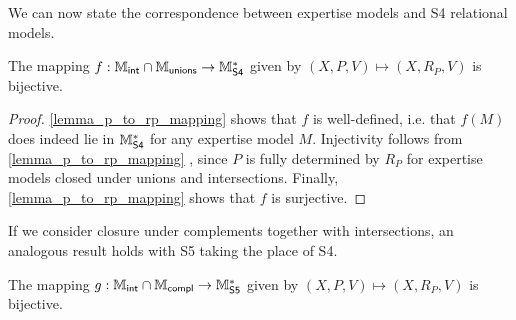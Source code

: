 We can now state the correspondence between expertise models and S4 relational
models.

\begin{theorem}
\label{thm_s4_semantic_link}

    The mapping $f: \mathbb{M}_{\mathsf{int}} \cap \mathbb{M}_{\mathsf{unions}} \to \mathbb{M}^*_{\mathsf{S4}}$ given by $(X, P, V)
    \mapsto (X, R_P, V)$ is bijective.
\end{theorem}

\begin{proof}

    \cref{lemma_p_to_rp_mapping}  shows that $f$ is
    well-defined, i.e. that $f(M)$ does indeed lie in $\mathbb{M}^*_{\mathsf{S4}}$ for any
    expertise model $M$. Injectivity follows from \cref{lemma_p_to_rp_mapping}
    , since $P$ is fully determined by $R_P$ for
    expertise models closed under unions and intersections. Finally,
    \cref{lemma_p_to_rp_mapping}  shows that $f$
    is surjective.

\end{proof}

If we consider closure under complements together with intersections, an
analogous result holds with S5 taking the place of S4.

\begin{theorem}
\label{thm_s5_semantic_link}

    The mapping $g: \mathbb{M}_{\mathsf{int}} \cap \mathbb{M}_{\mathsf{compl}} \to \mathbb{M}^*_{\mathsf{S5}}$ given by $(X, P, V)
    \mapsto (X, R_P, V)$ is bijective.
\end{theorem}

